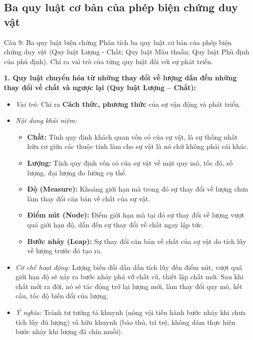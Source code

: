 \documentclass[12pt,a4paper]{article}
\begin{document}
{\subsection{Ba quy luật cơ bản của phép biện chứng duy vật}

\begin{questionbox}{Câu 9: Ba quy luật biện chứng}
Phân tích ba quy luật cơ bản của phép biện chứng duy vật (Quy luật Lượng - Chất; Quy luật Mâu thuẫn; Quy luật Phủ định của phủ định). Chỉ ra vai trò của từng quy luật đối với sự phát triển.
\end{questionbox}

\noindent
\textbf{1. Quy luật chuyển hóa từ những thay đổi về lượng dẫn đến những thay đổi về chất và ngược lại (Quy luật Lượng -- Chất):}
\begin{itemize}
    \item \textit{Vai trò:} Chỉ ra \textbf{Cách thức, phương thức} của sự vận động và phát triển.
    \item \textit{Nội dung khái niệm:}
    \begin{itemize}
        \item \textbf{Chất:} Tính quy định khách quan vốn có của sự vật, là sự thống nhất hữu cơ giữa các thuộc tính làm cho sự vật là nó chứ không phải cái khác.
        \item \textbf{Lượng:} Tính quy định vốn có của sự vật về mặt quy mô, tốc độ, số lượng, đại lượng đo lường cụ thể.
        \item \textbf{Độ (Measure):} Khoảng giới hạn mà trong đó sự thay đổi về lượng chưa làm thay đổi căn bản về chất của sự vật.
        \item \textbf{Điểm nút (Node):} Điểm giới hạn mà tại đó sự thay đổi về lượng vượt quá giới hạn độ, dẫn đến sự thay đổi về chất ngay lập tức.
        \item \textbf{Bước nhảy (Leap):} Sự thay đổi căn bản về chất của sự vật do tích lũy về lượng trước đó tạo ra.
    \end{itemize}
    \item \textit{Cơ chế hoạt động:} Lượng biến đổi dần dần tích lũy đến điểm nút, vượt quá giới hạn độ sẽ xảy ra bước nhảy phá vỡ chất cũ, thiết lập chất mới. Sau khi chất mới ra đời, nó sẽ tác động trở lại lượng mới, làm thay đổi quy mô, kết cấu, tốc độ biến đổi của lượng.
    \item \textit{Ý nghĩa:} Tránh tư tưởng tả khuynh (nóng vội tiến hành bước nhảy khi chưa tích lũy đủ lượng) và hữu khuynh (bảo thủ, trì trệ, không dám thực hiện bước nhảy khi lượng đã chín muồi).
\end{itemize}

}
\end{document}

